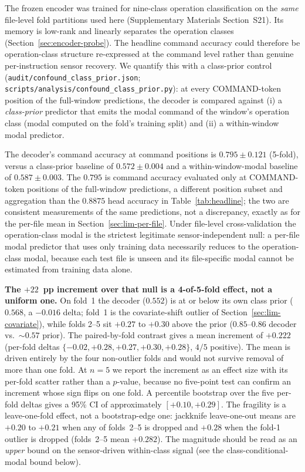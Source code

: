 \documentclass[sensors,article,submit,moreauthors,pdftex]{Definitions/mdpi}
\begin{document}
The frozen encoder was trained for nine-class operation classification on the \emph{same} file-level fold partitions used here (Supplementary Materials Section~S21). Its memory is low-rank and linearly separates the operation classes (Section~\ref{sec:encoder-probe}). The headline command accuracy could therefore be operation-class structure re-expressed at the command level rather than genuine per-instruction sensor recovery. We quantify this with a class-prior control (\texttt{audit/confound\_class\_prior.json}; \texttt{scripts/analysis/confound\_class\_prior.py}): at every COMMAND-token position of the full-window predictions, the decoder is compared against (i) a \emph{class-prior} predictor that emits the modal command of the window's operation class (modal computed on the fold's training split) and (ii) a within-window modal predictor.

The decoder's command accuracy at command positions is $0.795 \pm 0.121$ (5-fold), versus a class-prior baseline of $0.572 \pm 0.004$ and a within-window-modal baseline of $0.587 \pm 0.003$. The $0.795$ is command accuracy evaluated only at COMMAND-token positions of the full-window predictions, a different position subset and aggregation than the $0.8875$ head accuracy in Table~\ref{tab:headline}; the two are consistent measurements of the same predictions, not a discrepancy, exactly as for the per-file mean in Section~\ref{sec:lim-per-file}. Under file-level cross-validation the operation-class modal is the strictest legitimate sensor-independent null: a per-file modal predictor that uses only training data necessarily reduces to the operation-class modal, because each test file is unseen and its file-specific modal cannot be estimated from training data alone.

\textbf{The $+22$~pp increment over that null is a 4-of-5-fold effect, not a uniform one.} On fold~1 the decoder ($0.552$) is at or below its own class prior ($0.568$, a $-0.016$ delta; fold~1 is the covariate-shift outlier of Section~\ref{sec:lim-covariate}), while folds 2--5 sit $+0.27$ to $+0.30$ above the prior ($0.85$--$0.86$ decoder vs.\ $\sim\!0.57$ prior). The paired-by-fold contrast gives a mean increment of $+0.222$ (per-fold deltas $\{-0.02, +0.28, +0.27, +0.30, +0.28\}$, $4/5$ positive). The mean is driven entirely by the four non-outlier folds and would not survive removal of more than one fold. At $n\!=\!5$ we report the increment as an effect size with its per-fold scatter rather than a $p$-value, because no five-point test can confirm an increment whose sign flips on one fold. A percentile bootstrap over the five per-fold deltas gives a 95\% CI of approximately $[+0.10, +0.29]$. The fragility is a leave-one-fold effect, not a bootstrap-edge one: jackknife leave-one-out means are $+0.20$ to $+0.21$ when any of folds~2--5 is dropped and $+0.28$ when the fold-1 outlier is dropped (folds~2--5 mean $+0.282$). The magnitude should be read as an \emph{upper} bound on the sensor-driven within-class signal (see the class-conditional-modal bound below).
\end{document}
